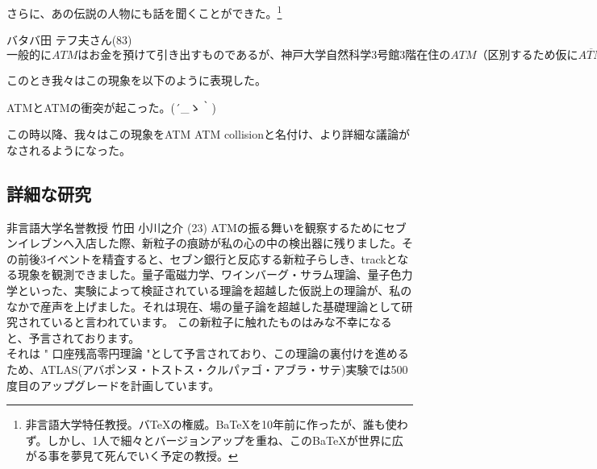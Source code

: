 さらに、あの伝説の人物にも話を聞くことができた。\footnote{非言語大学特任教授。バTeXの権威。BaTeXを10年前に作ったが、誰も使わず。しかし、1人で細々とバージョンアップを重ね、このBaTeXが世界に広がる事を夢見て死んでいく予定の教授。} \\
\begin{itembox}[c]{バタバ田 テフ夫さん(83) }
$一般的にATMはお金を預けて引き出すものであるが、神戸大学自然科学3号館3階在住のATM（区別するため仮に\overline{ATM}とする。）はこれとは逆の性質を持ち、お金を借り入れることができる。
このことから一部では\overline{ATM}がATMの反物質ではないかという理論予想がされていた。
これを実験的に確かめる方法は容易で、ATMと\overline{ATM}が衝突した時に対消滅を起こせば\overline{ATM}はATMの反物質であると断定できる。
しかしATMは反応断面積・ルミノシティ共に非常に小さいため、これを観測するのは至難の技であり、今日（こんにち）まで観測を行った人間は誰一人としていなかった。
そしてこの日、我々は奇跡的にその観測を成功させたのである。
ところが、ATMは消滅することなく、お金をATMから\overline{ATM}に与える形での相互作用を起こした。
こうして前述の理論は白紙に戻ったわけであるが、この観測がATM理論のブレイクスルーとなることを私は期待している。$
\end{itembox}

このとき我々はこの現象を以下のように表現した。\\
\begin{center}
{\LARGE \mc ATMとATMの衝突が起こった。{\sf (´\_ゝ｀)}}
\end{center}

この時以降、我々はこの現象をATM ATM collisionと名付け、より詳細な議論がなされるようになった。


\newpage
\subsection{詳細な研究}

\begin{itembox}[c]{非言語大学名誉教授 竹田 小川之介 (23)}
ATMの振る舞いを観察するためにセブンイレブンへ入店した際、新粒子の痕跡が私の心の中の検出器に残りました。その前後3イベントを精査すると、セブン銀行と反応する新粒子らしき、trackとなる現象を観測できました。量子電磁力学、ワインバーグ・サラム理論、量子色力学といった、実験によって検証されている理論を超越した仮説上の理論が、私のなかで産声を上げました。それは現在、場の量子論を超越した基礎理論として研究されていると言われています。
この新粒子に触れたものはみな不幸になると、予言されております。\\
それは " 口座残高零円理論 "として予言されており、この理論の裏付けを進めるため、ATLAS(アバポンヌ・トストス・クルパァゴ・アブラ・サテ)実験では500度目のアップグレードを計画しています。
\end{itembox}

